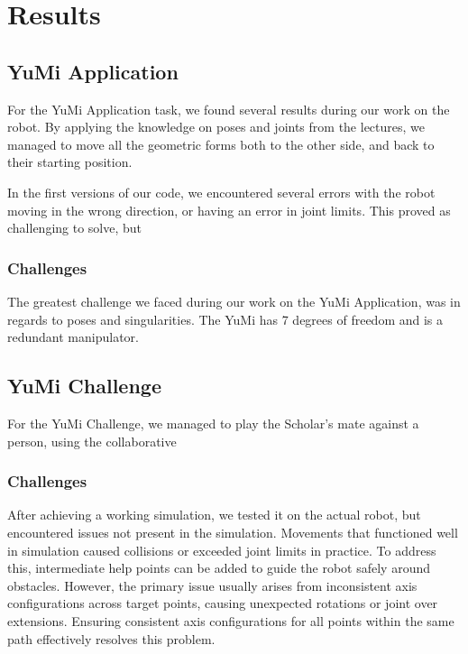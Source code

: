 \documentclass[a4paper,12pt]{article}
\begin{document}
\section{Results}
\subsection{YuMi Application}
For the YuMi Application task, we found several results during our work on the robot. By applying the knowledge on poses and joints from the lectures, we managed to move all the geometric forms both to the other side, and back to their starting position. 


In the first versions of our code, we encountered several errors with the robot moving in the wrong direction, or having an error in joint limits. This proved as challenging to solve, but 



\subsubsection{Challenges}
The greatest challenge we faced during our work on the YuMi Application, was in regards to poses and singularities. 
The YuMi has 7 degrees of freedom and is a redundant manipulator.

\subsection{YuMi Challenge}
For the YuMi Challenge, we managed to play the Scholar's mate against a person, using the collaborative 
\subsubsection{Challenges}

After achieving a working simulation, we tested it on the actual robot, but encountered issues not present in the simulation. Movements that functioned well in simulation caused collisions or exceeded joint limits in practice. To address this, intermediate help points can be added to guide the robot safely around obstacles. However, the primary issue usually arises from inconsistent axis configurations across target points, causing unexpected rotations or joint over extensions. Ensuring consistent axis configurations for all points within the same path effectively resolves this problem.
\end{document}
